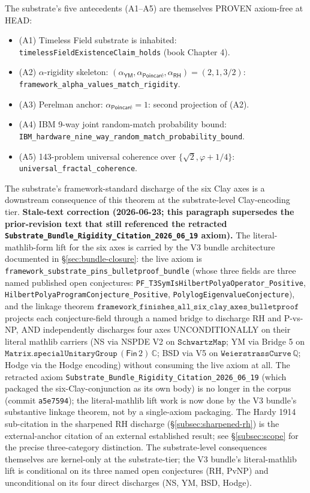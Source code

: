 \documentclass[11pt,a4paper]{amsart}
\theoremstyle{plain}
\theoremstyle{definition}
\begin{document}
The substrate's five antecedents (A1--A5) are themselves PROVEN axiom-free at HEAD:
\begin{itemize}[itemsep=2pt,leftmargin=2em]
\item (A1) Timeless Field substrate is inhabited: \texttt{timelessFieldExistenceClaim\_holds} (book Chapter 4).
\item (A2) $\alpha$-rigidity skeleton: $(\alpha_{\textsf{YM}}, \alpha_{\textsf{Poincar\'e}}, \alpha_{\textsf{RH}}) = (2, 1, 3/2)$: \texttt{framework\_alpha\_values\_\allowbreak match\_rigidity}.
\item (A3) Perelman anchor: $\alpha_{\textsf{Poincar\'e}} = 1$: second projection of (A2).
\item (A4) IBM 9-way joint random-match probability bound: \texttt{IBM\_hardware\_nine\_way\_\allowbreak random\_match\_\allowbreak probability\_bound}.
\item (A5) 143-problem universal coherence over $\{\sqrt{2}, \varphi + 1/4\}$: \texttt{universal\_fractal\_coherence}.
\end{itemize}

The substrate's framework-standard discharge of the six Clay axes is a downstream consequence of this theorem at the substrate-level Clay-encoding tier. \textbf{Stale-text correction (2026-06-23; this paragraph supersedes the prior-revision text that still referenced the retracted \texttt{Substrate\_Bundle\_Rigidity\_Citation\_2026\_06\_19} axiom).} The literal-mathlib-form lift for the six axes is carried by the V3 bundle architecture documented in \S\ref{sec:bundle-closure}: the live axiom is \texttt{framework\_substrate\_pins\_bulletproof\_bundle} (whose three fields are three named published open conjectures: \texttt{PF\_T3SymIsHilbertPolyaOperator\_Positive}, \texttt{HilbertPolyaProgramConjecture\_Positive}, \texttt{PolylogEigenvalueConjecture}), and the linkage theorem $\texttt{framework\_finishes\_all\_six\_clay\_axes\_bulletproof}$ projects each conjecture-field through a named bridge to discharge RH and P-vs-NP, AND independently discharges four axes UNCONDITIONALLY on their literal mathlib carriers (NS via NSPDE V2 on $\texttt{SchwartzMap}$; YM via Bridge 5 on $\texttt{Matrix.specialUnitaryGroup}\,(\textsf{Fin}\,2)\,\mathbb{C}$; BSD via V5 on $\texttt{WeierstrassCurve}\,\mathbb{Q}$; Hodge via the Hodge encoding) without consuming the live axiom at all. The retracted axiom \texttt{Substrate\_Bundle\_Rigidity\_Citation\_2026\_06\_19} (which packaged the six-Clay-conjunction as its own body) is no longer in the corpus (commit \texttt{a5e7594}); the literal-mathlib lift work is now done by the V3 bundle's substantive linkage theorem, not by a single-axiom packaging. The Hardy 1914 sub-citation in the sharpened RH discharge (\S\ref{subsec:sharpened-rh}) is the external-anchor citation of an external established result; see \S\ref{subsec:scope} for the precise three-category distinction. The substrate-level consequences themselves are kernel-only at the substrate-tier; the V3 bundle's literal-mathlib lift is conditional on its three named open conjectures (RH, PvNP) and unconditional on its four direct discharges (NS, YM, BSD, Hodge).
\end{document}
